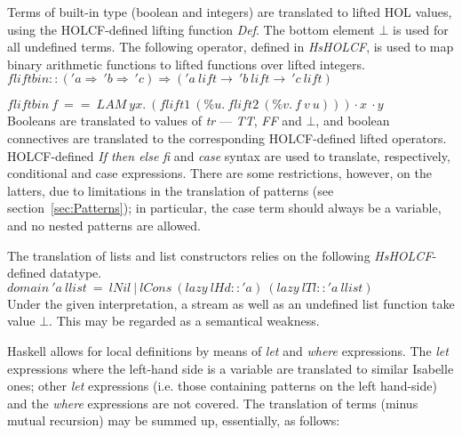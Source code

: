 \documentclass{llncs}
\begin{document}

Terms of built-in type (boolean and integers) are translated to lifted
HOL values, using the HOLCF-defined lifting function \emph{Def}.  The
bottom element $\bot$ is used for all undefined terms.  The following
operator, defined in \emph{HsHOLCF}, is used to map binary arithmetic
functions to lifted functions over
lifted integers.\\

$fliftbin :: ('a \Rightarrow \ 'b \Rightarrow \ 'c) 
  \Rightarrow ('a \ lift \to \ 'b \ lift \to \ 'c \ lift) $
 
$fliftbin \ f \ == \ LAM \ y x. \ (flift1 \ (\%u. \ flift2 \ (\%v. \ f \ v \ u))) \cdot x \ \cdot y $\\

\noindent Booleans are translated to values of \emph{tr} ---
\emph{TT}, \emph{FF} and $\bot$, and boolean connectives are
translated to the corresponding HOLCF-defined lifted operators.
HOLCF-defined \emph{If then else fi} and \emph{case} syntax are used
to translate, respectively, conditional and case expressions. There
are some restrictions, however, on the latters, due to limitations in
the translation of patterns (see section~\ref{sec:Patterns}); in
particular, the case term should always be a variable, and no nested
patterns are allowed.

The translation of lists and list constructors relies on the
following \emph{HsHOLCF}-defined datatype.\\

$domain \ 'a\ llist \ = \ lNil \ | \ lCons \ (lazy \ lHd ::'a) \ (lazy \ lTl ::'a \ llist) $\\

\noindent Under the given interpretation, a stream as well as an
undefined list function take value $\bot$. This may be regarded as a
semantical weakness.

Haskell allows for local definitions by means of \emph{let} and
\emph{where} expressions. The \emph{let} expressions where the
left-hand side is a variable are translated to similar Isabelle ones;
other \emph{let} expressions (i.e. those containing patterns on the
left hand-side) and the \emph{where} expressions are not covered. The
translation of terms (minus mutual recursion) may be summed up,
essentially, as follows:
\end{document}
